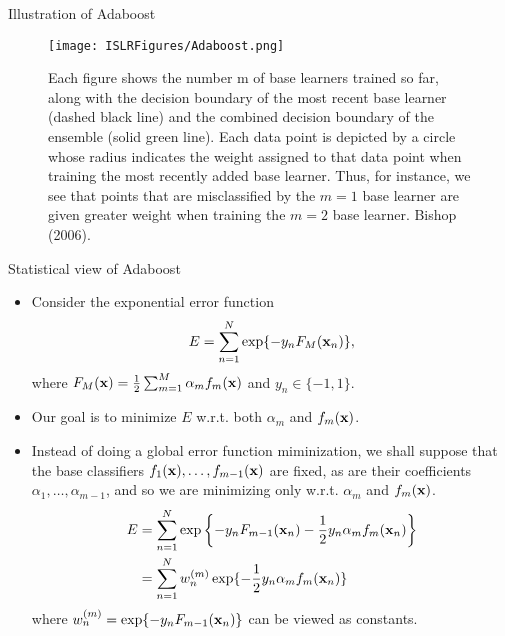 \documentclass{beamer}
\def\bfx{{\bf x}}
\begin{document}
                     \begin{frame}{Illustration of Adaboost}

                      \begin{figure}
                        \centering
                        
                        \centering
                        \texttt{[image: ISLRFigures/Adaboost.png]}
                        \caption{\footnotesize Each figure shows the number m of base learners trained so far, along with the decision
boundary of the most recent base learner (dashed black line) and the combined decision boundary of the ensemble
(solid green line). Each data point is depicted by a circle whose radius indicates the weight assigned to
that data point when training the most recently added base learner. Thus, for instance, we see that points that
are misclassified by the $m = 1$ base learner are given greater weight when training the $m = 2$ base learner. Bishop (2006).
                        }
                      \end{figure}

                     \end{frame}

                    

                     \begin{frame}{Statistical view of Adaboost}
                     \begin{itemize}\footnotesize
                      \item Consider the exponential error function 
                      \begin{align}\label{exp_loss}
                      E = \sum^N_{n=1} \exp\{-y_n F_M(\bfx_n)\},
                      \end{align}
                      where $F_M(\bfx)=\frac{1}{2}\sum^M_{m=1} \alpha_m f_m(\bfx)$ and $y_n\in \{-1,1\}$. 
                      \item Our goal is to minimize $E$ w.r.t. both $\alpha_m$ and $f_m(\bfx)$.
                      \item Instead of doing a global error function miminization, we shall suppose that the base classifiers $f_1(\bfx),\dots, f_{m-1}(\bfx)$ are fixed, as are their coefficients $\alpha_1,\dots,\alpha_{m-1}$, and so we are minimizing only w.r.t. $\alpha_m$ and $f_m(\bfx)$.
                      \begin{align}\label{E-sep}
                      E&=\sum^N_{n=1}\exp\left\{ -y_n F_{m-1}(\bfx_n) - \frac{1}{2} y_n \alpha_m f_m(\bfx_n)\right\}\nonumber\\
                      &=\sum^N_{n=1}w_n^{(m)}\exp\{-\frac{1}{2}y_n \alpha_m f_m(\bfx_n)\}
                      \end{align}
                      where $w_n^{(m)}=\exp\{-y_n F_{m-1}(\bfx_n)\}$ can be viewed as constants.
                     \end{itemize}
                     \end{frame}
                     
\end{document}
